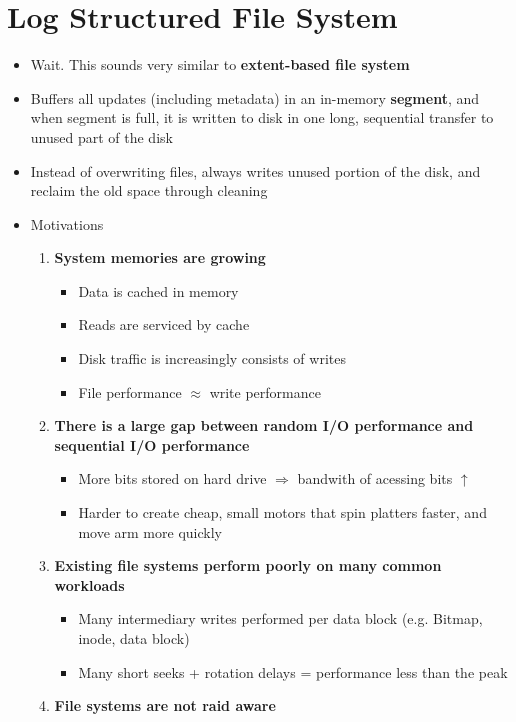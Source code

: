 \documentclass[12pt]{article}
\begin{document}
\section{Log Structured File System}
\begin{itemize}
    \item Wait. This sounds very similar to \textbf{extent-based file system}
    \item Buffers all updates (including metadata) in an in-memory \textbf{segment},
    and when segment is full, it is written to disk in one long, sequential
    transfer to unused part of the disk
    \item Instead of overwriting files, always writes unused
    portion of the disk, and reclaim the old space through cleaning

    \item Motivations
    \begin{enumerate}[1.]
        \item \textbf{System memories are growing}
        \begin{itemize}
            \item Data is cached in memory
            \item Reads are serviced by cache
            \item Disk traffic is increasingly consists of writes
            \item File performance $\approx$ write performance
        \end{itemize}
        \item \textbf{There is a large gap between random I/O performance and
        sequential I/O performance}
        \begin{itemize}
            \item More bits stored on hard drive $\Rightarrow$ bandwith of acessing bits $\uparrow$
            \item Harder to create cheap, small motors that spin platters faster, and move arm more quickly
        \end{itemize}
        \item \textbf{Existing file systems perform poorly on many common workloads}
        \begin{itemize}
            \item Many intermediary writes performed per data block (e.g. Bitmap, inode, data block)
            \item Many short seeks + rotation delays = performance less than the peak
        \end{itemize}
        \item \textbf{File systems are not raid aware}
    \end{enumerate}


\end{itemize}
\end{document}
